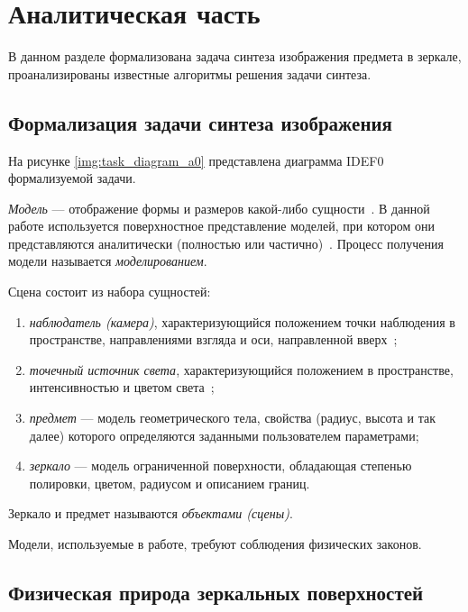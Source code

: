 \chapter{Аналитическая часть}

В данном разделе формализована задача синтеза изображения предмета в зеркале, проанализированы известные алгоритмы решения задачи синтеза.

\section{Формализация задачи синтеза изображения}

На рисунке \ref{img:task_diagram_a0} представлена диаграмма IDEF0 формализуемой задачи.


\textit{Модель} --- отображение формы и размеров какой-либо сущности~\cite{куров}.
В данной работе используется поверхностное представление моделей, при котором они представляются аналитически (полностью или частично)~\cite{куров}.
Процесс получения модели называется \textit{моделированием}.

Сцена состоит из набора сущностей:
\begin{enumerate}
	\item \textit{наблюдатель (камера)}, характеризующийся положением точки наблюдения в пространстве, направлениями взгляда и оси, направленной вверх~\cite{куров};
	\item \textit{точечный источник света}, характеризующийся положением в пространстве, интенсивностью и цветом света~\cite{куров};
	\item \textit{предмет} --- модель геометрического тела, свойства (радиус, высота и так далее) которого определяются заданными пользователем параметрами;
	\item \textit{зеркало} --- модель ограниченной поверхности, обладающая степенью полировки, цветом, радиусом и описанием границ.
\end{enumerate}

Зеркало и предмет называются \textit{объектами (сцены)}.

Модели, используемые в работе, требуют соблюдения физических законов.

\section{Физическая природа зеркальных поверхностей}

